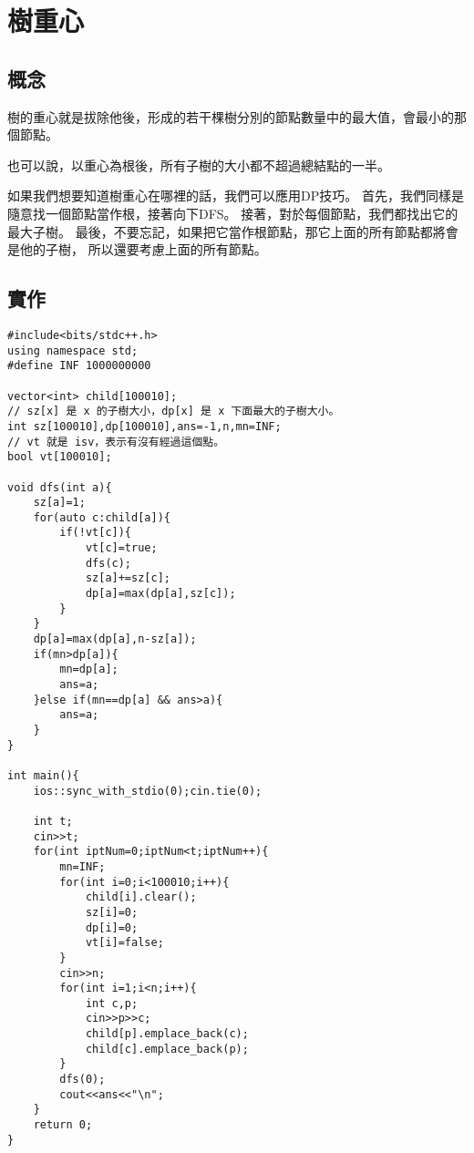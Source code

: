 \section{樹重心}
    \author{Shang Jhe Li}

    \subsection{概念}
    樹的重心就是拔除他後，形成的若干棵樹分別的節點數量中的最大值，會最小的那個節點。

    也可以說，以重心為根後，所有子樹的大小都不超過總結點的一半。

    如果我們想要知道樹重心在哪裡的話，我們可以應用DP技巧。
    首先，我們同樣是隨意找一個節點當作根，接著向下DFS。
    接著，對於每個節點，我們都找出它的最大子樹。
    最後，不要忘記，如果把它當作根節點，那它上面的所有節點都將會是他的子樹，
    所以還要考慮上面的所有節點。

    \subsection{實作}

\begin{lstlisting}[caption=樹重心]
#include<bits/stdc++.h>
using namespace std;
#define INF 1000000000

vector<int> child[100010];
// sz[x] 是 x 的子樹大小，dp[x] 是 x 下面最大的子樹大小。
int sz[100010],dp[100010],ans=-1,n,mn=INF;
// vt 就是 isv，表示有沒有經過這個點。
bool vt[100010];

void dfs(int a){
    sz[a]=1;
    for(auto c:child[a]){
        if(!vt[c]){
            vt[c]=true;
            dfs(c);
            sz[a]+=sz[c];
            dp[a]=max(dp[a],sz[c]);
        }
    }
    dp[a]=max(dp[a],n-sz[a]);
    if(mn>dp[a]){
        mn=dp[a];
        ans=a;
    }else if(mn==dp[a] && ans>a){
        ans=a;
    }
}

int main(){
    ios::sync_with_stdio(0);cin.tie(0);
    
    int t;
    cin>>t;
    for(int iptNum=0;iptNum<t;iptNum++){
        mn=INF;
        for(int i=0;i<100010;i++){
            child[i].clear();
            sz[i]=0;
            dp[i]=0;
            vt[i]=false;
        } 
        cin>>n;
        for(int i=1;i<n;i++){
            int c,p;
            cin>>p>>c;
            child[p].emplace_back(c);
            child[c].emplace_back(p);
        }
        dfs(0);
        cout<<ans<<"\n";
    }
    return 0;
}
\end{lstlisting}

